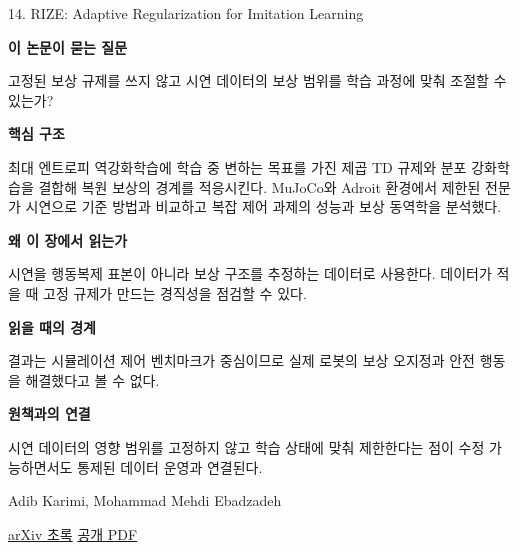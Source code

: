 \documentclass[11pt,openany]{book}
\begin{document}
\begin{termcard}{14. RIZE: Adaptive Regularization for Imitation Learning}

\par

\medskip

{\sffamily\bfseries\color{deepblue} 이 논문이 묻는 질문}\par

고정된 보상 규제를 쓰지 않고 시연 데이터의 보상 범위를 학습 과정에 맞춰 조절할 수 있는가?

\smallskip

{\sffamily\bfseries\color{deepblue} 핵심 구조}\par

최대 엔트로피 역강화학습에 학습 중 변하는 목표를 가진 제곱 TD 규제와 분포 강화학습을 결합해 복원 보상의 경계를 적응시킨다. MuJoCo와 Adroit 환경에서 제한된 전문가 시연으로 기준 방법과 비교하고 복잡 제어 과제의 성능과 보상 동역학을 분석했다.

\smallskip

{\sffamily\bfseries\color{deepblue} 왜 이 장에서 읽는가}\par

시연을 행동복제 표본이 아니라 보상 구조를 추정하는 데이터로 사용한다. 데이터가 적을 때 고정 규제가 만드는 경직성을 점검할 수 있다.

\smallskip

{\sffamily\bfseries\color{coral} 읽을 때의 경계}\par

결과는 시뮬레이션 제어 벤치마크가 중심이므로 실제 로봇의 보상 오지정과 안전 행동을 해결했다고 볼 수 없다.

\smallskip

{\sffamily\bfseries\color{teal} 원책과의 연결}\par

시연 데이터의 영향 범위를 고정하지 않고 학습 상태에 맞춰 제한한다는 점이 수정 가능하면서도 통제된 데이터 운영과 연결된다.

\medskip

{\footnotesize\color{muted} Adib Karimi, Mohammad Mehdi Ebadzadeh\par

\href{https://arxiv.org/abs/2502.20089}{arXiv 초록} \quad \href{https://arxiv.org/pdf/2502.20089}{공개 PDF}\par}

\end{termcard}
\end{document}
